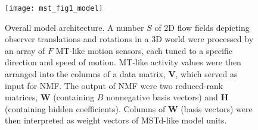 \begin{figure}[t]
  \centering
  \texttt{[image: mst\_fig1\_model]}
  \caption{
  Overall model architecture. A number $S$ of 2D flow fields depicting observer
  translations and rotations in a 3D world were processed by an array of $F$ 
  \ac{MT}-like motion sensors, each tuned to a specific direction and speed of motion. 
  \ac{MT}-like activity values were then arranged into the columns of a data matrix, 
  $\mathbf{V}$, which served as input for \acf{NMF}. 
  The output of \ac{NMF} were two reduced-rank matrices, $\mathbf{W}$
  (containing $B$ nonnegative basis vectors) and $\mathbf{H}$ (containing hidden
  coefficients). Columns of $\mathbf{W}$ (basis vectors) were then interpreted as 
  weight vectors of \ac{MSTd}-like model units.}
  \label{fig:MSTd|model}
\end{figure}


